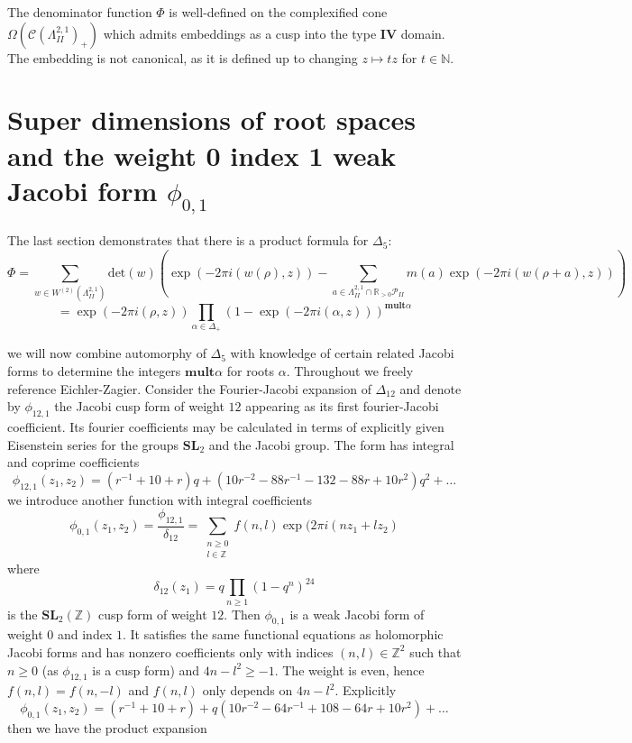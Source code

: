 \documentclass[9pt]{amsart} \usepackage[utf8]{inputenc}
\newcommand{\N}{\mathbb{N}}
\newcommand{\Z}{\mathbb{Z}} \newcommand{\C}{\mathbb{C}}
\newcommand{\R}{\mathbb{R}} \newcommand{\La}{\Lambda}
\newcommand{\SL}{\mathbf{SL}}
\newcommand{\IV}{\mathbf{IV}}
\newcommand{\Cone}{\mathcal{C}}
\newcommand{\Poly}{\mathcal{P}}
\begin{document}
The denominator function $\Phi$ is well-defined on the complexified cone
$\Omega(\Cone(\La^{2,1}_{II})_+)$ which admits embeddings as a cusp into
the type $\IV$ domain. The embedding is not canonical, as it is defined
up to changing $z\mapsto tz$ for $t\in \N$.

\section{Super dimensions of root spaces and the weight 0 index 1 weak Jacobi
form $\phi_{0,1}$}

The last section demonstrates that there is a product formula for
$\Delta_5$:
$$\Phi = \sum_{w \in W^{(2)}(\La^{2,1}_{II})} \text{det}(w)
(\exp(-2\pi i(w(\rho), z)) - \sum_{a\in \La^{2,1}_{II} \cap \R_{>0}
\Poly_{II}} m(a) \exp(-2\pi i(w(\rho + a), z)) ) $$ $$= \exp(-2\pi i(\rho,z))
\displaystyle\prod_{\alpha \in \Delta_+} (1 - \exp(-2\pi i
(\alpha,z)))^{\textbf{mult}\alpha}$$

we will now combine automorphy of $\Delta_5$ with knowledge of certain
related Jacobi forms to determine the integers $\textbf{mult}\alpha$ for
roots $\alpha$.
Throughout we freely reference Eichler-Zagier\cite{EZ:1}.
Consider the Fourier-Jacobi expansion of $\Delta_{12}$ and denote by
$\phi_{12,1}$ the Jacobi cusp form of weight $12$ appearing as its first
fourier-Jacobi coefficient. Its fourier coefficients may be calculated
in terms of explicitly given Eisenstein series for the groups $\SL_2$
and the Jacobi group. The form has integral and coprime coefficients
$$\phi_{12,1}(z_1,z_2) = (r^{-1} + 10 + r)q + (10r^{-2} -88r^{-1} -132
-88r +10r^{2})q^2 + \ldots$$ we introduce another function with integral
coefficients $$\displaystyle\phi_{0,1} (z_1,z_2) =
\frac{\phi_{12,1}}{\delta_{12}} = \displaystyle\sum_{\substack{n\geq 0\\l\in \Z}}
f(n,l)\exp(2\pi i(nz_1 + lz_2)$$ where $$\delta_{12}(z_1) = q\displaystyle\prod_{n\geq
1}(1 - q^n)^{24}$$ is the $\SL_2(\Z)$ cusp form of weight $12$. Then
$\phi_{0,1}$ is a weak Jacobi form of weight $0$ and index $1$. It
satisfies the same functional equations as holomorphic Jacobi forms and
has nonzero coefficients only with indices $(n,l) \in \Z^2$ such that
$n\geq 0$ (as $\phi_{12,1}$ is a cusp form) and $4n - l^2 \geq -1$. The
weight is even, hence $f(n,l) = f(n,-l)$ and $f(n,l)$ only depends on
$4n-l^2$. Explicitly $$\phi_{0,1} (z_1,z_2) = (r^{-1} +10 + r) +
q(10r^{-2} - 64r^{-1} + 108  -64r + 10r^2) + \ldots$$
then we have the product expansion
\end{document}
